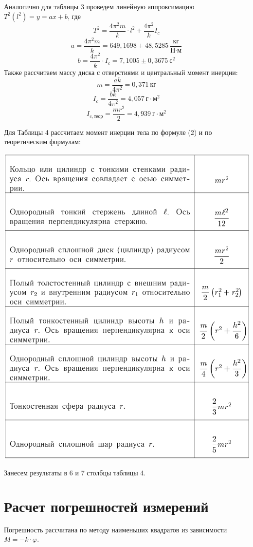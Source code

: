 \documentclass[a4paper,14pt]{article}
\begin{document}
Аналогично для таблицы 3 проведем линейную аппроксимацию $T^2(l^2) = y = ax + b$, где
\[T^2 = \frac{4\pi^2m}{k}\cdot l^2 + \frac{4\pi^2}{k}I_{c}\]
\[a = \frac{4\pi^2m}{k} = 649,1698\pm	48,5285 \ \frac{\text{кг}}{\text{Н}\cdot\text{м}}\]
\[b = \frac{4\pi^2}{k}\cdot I_{c} = 7,1005\pm0,3675 \ \text{с}^2\]
Также рассчитаем массу диска с отверстиями и центральный момент инерции:
\[m = \frac{ak}{4\pi^2} = 0,371 \ \text{кг}\]
\[I_{c} = \frac{bk}{4\pi^2} = 4,057 \ \text{г}\cdot\text{м}^2\]
\[I_{c, \text{теор}} = \frac{mr^2}{2} = 4,939 \ \text{г}\cdot\text{м}^2\]

Для Таблицы 4 рассчитаем момент инерции тела по формуле (2) и по теоретическим формулам: 
\begin{center}
	\includegraphics[width=0.9\linewidth]{./formulas}
\end{center}

Занесем результаты в 6 и 7 столбцы таблицы 4.

\section{Расчет погрешностей измерений}

Погрешность рассчитана по методу наименьших квадратов из зависимости $M = -k\cdot \varphi$.
\end{document}
